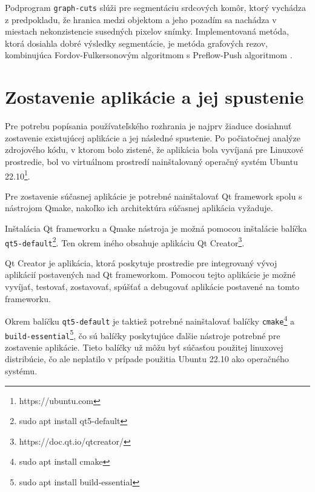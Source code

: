 Podprogram \texttt{graph-cuts} slúži pre segmentáciu srdcových komôr, ktorý vychádza z predpokladu, že hranica medzi objektom a jeho pozadím sa nachádza v miestach nekonzistencie susedných pixelov snímky. Implementovaná metóda, ktorá dosiahla dobré výsledky segmentácie, je metóda grafových rezov, kombinujúca Fordov-Fulkersonovým algoritmom s Preflow-Push algoritmom \cite{master_thesis_app}.

\section {Zostavenie aplikácie a jej spustenie}
Pre potrebu popísania používateľského rozhrania je najprv žiaduce dosiahnuť zostavenie existujúcej aplikácie a jej následné spustenie. Po počiatočnej analýze zdrojového kódu, v ktorom bolo zistené, že aplikácia bola vyvíjaná pre Linuxové prostredie, bol vo virtuálnom prostredí nainštalovaný operačný systém Ubuntu 22.10\footnote{https://ubuntu.com}.

Pre zostavenie súčasnej aplikácie je potrebné nainštalovať Qt framework spolu s nástrojom Qmake, nakoľko ich architektúra súčasnej aplikácia vyžaduje.

Inštalácia Qt frameworku a Qmake nástroja je možná pomocou inštalácie balíčka \texttt{qt5-default}\footnote{sudo apt install qt5-default}. Ten okrem iného obsahuje aplikáciu Qt Creator\footnote{https://doc.qt.io/qtcreator/}.

Qt Creator je aplikácia, ktorá poskytuje prostredie pre integrovaný vývoj aplikácií postavených nad Qt frameworkom. \newline Pomocou tejto aplikácie je možné vyvíjať, testovať, zostavovať, spúšťať a debugovať aplikácie postavené na tomto frameworku.

Okrem balíčku \texttt{qt5-default} je taktiež potrebné nainštalovať balíčky \texttt{cmake}\footnote{sudo apt install cmake} a \texttt{build-essential}\footnote{sudo apt install build-essential}, čo sú balíčky poskytujúce ďalšie nástroje potrebné pre zostavenie aplikácie. Tieto balíčky už môžu byť súčasťou použitej linuxovej distribúcie, čo ale neplatilo v prípade použitia Ubuntu 22.10 ako operačného systému.

